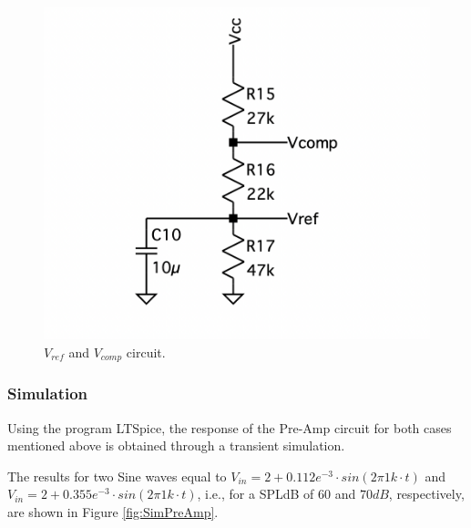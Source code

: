 \begin{figure}[H]
    \centering
    \includegraphics*[scale = 0.3]{Images/VrefVcomp.png}
    \caption{$V_{ref}$ and $V_{comp}$ circuit.}
    \label{fig:VrefVcomp}
\end{figure}

\subsubsection{Simulation}

Using the program LTSpice, the response of the Pre-Amp circuit for both cases mentioned above is obtained through a transient simulation.

The results for two Sine waves equal to $V_{in} = 2 + 0.112e^{-3} \cdot sin(2\pi 1k \cdot t)$ and $V_{in} = 2 + 0.355e^{-3} \cdot sin(2\pi 1k \cdot t)$, i.e., for a SPLdB of $60$ and $70 dB$, respectively, are shown in Figure \ref{fig:SimPreAmp}.

